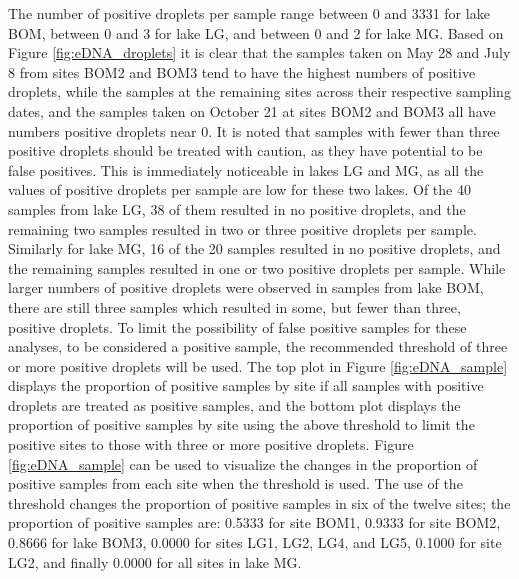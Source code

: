 \documentclass[12pt]{article}\usepackage[]{graphicx}\usepackage[]{color}
\begin{document}
The number of positive droplets per sample range between 0 and 3331 for lake BOM, between 0 and 3 for lake LG, and between 0 and 2 for lake MG. Based on Figure \ref{fig:eDNA_droplets} it is clear that the samples taken on May 28 and July 8 from sites BOM2 and BOM3 tend to have the highest numbers of positive droplets, while the samples at the remaining sites across their respective sampling dates, and the samples taken on October 21 at sites BOM2 and BOM3 all have numbers positive droplets near 0. It is noted that samples with fewer than three positive droplets should be treated with caution, as they have potential to be false positives. This is immediately noticeable in lakes LG and MG, as all the values of positive droplets per sample are low for these two lakes. Of the 40 samples from lake LG, 38 of them resulted in no positive droplets, and the remaining two samples resulted in two or three positive droplets per sample. Similarly for lake MG, 16 of the 20 samples resulted in no positive droplets, and the remaining samples resulted in one or two positive droplets per sample. While larger numbers of positive droplets were observed in samples from lake BOM, there are still three samples which resulted in some, but fewer than three, positive droplets. To limit the possibility of false positive samples for these analyses, to be considered a positive sample, the recommended threshold of three or more positive droplets will be used. The top plot in Figure \ref{fig:eDNA_sample} displays the proportion of positive samples by site if all samples with positive droplets are treated as positive samples, and the bottom plot displays the proportion of positive samples by site using the above threshold to limit the positive sites to those with three or more positive droplets. Figure \ref{fig:eDNA_sample} can be used to visualize the changes in the proportion of positive samples from each site when the threshold is used. The use of the threshold changes the proportion of positive samples in six of the twelve sites; the proportion of positive samples are: 0.5333 for site BOM1, 0.9333 for site BOM2, 0.8666 for lake BOM3, 0.0000 for sites LG1, LG2, LG4, and LG5, 0.1000 for site LG2,  and finally 0.0000 for all sites in lake MG.
\end{document}
